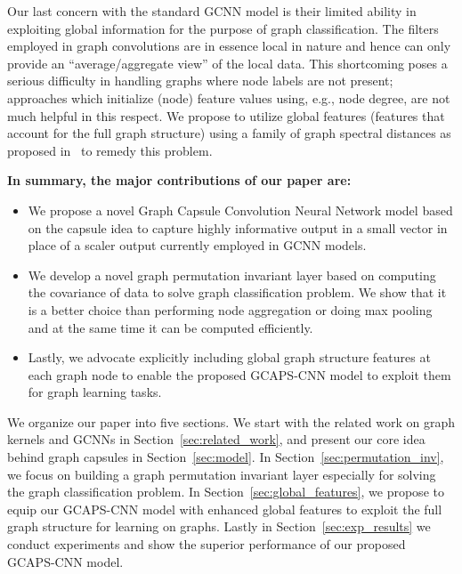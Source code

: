 \documentclass{article}
\begin{document}
Our last concern with the standard GCNN model  is their limited ability in exploiting global information for the purpose of  graph classification. The  filters employed in graph convolutions  are in essence  local in nature and hence can only provide an ``average/aggregate view'' of the local    data. This shortcoming poses a serious difficulty in handling graphs  where node labels are not present; approaches which initialize (node) feature values using, e.g.,  node degree, are not much helpful in this respect.   We propose to utilize global features (features that account for the full graph structure)  using a family of graph spectral distances as proposed in~\cite{verma2017hunt} to remedy this problem.


\textbf{In summary, the major contributions of our paper are: }
 
\begin{itemize}[leftmargin=*]
	\setlength\itemsep{-0.1em}
\item  We propose a novel Graph Capsule Convolution Neural  Network  model based on the capsule idea to capture highly informative output in a small vector  in place of a scaler output currently employed in  GCNN models. 
\item  We develop a novel graph permutation invariant layer based on computing the covariance of data to solve graph classification problem. We show that it is a better choice than performing node aggregation or doing max pooling and at the same time it can be computed efficiently.
\item  Lastly, we  advocate explicitly including global graph structure features  at each graph node to enable the proposed GCAPS-CNN model to exploit them for graph learning tasks. 
\end{itemize}

We organize our paper into five sections. We start with the related work on graph kernels and GCNNs in Section~\ref{sec:related_work}, and present our core idea behind graph capsules  in Section~\ref{sec:model}. In Section~\ref{sec:permutation_inv}, we focus on building a graph permutation invariant layer especially for solving the graph classification problem. In Section~\ref{sec:global_features}, we propose to equip our GCAPS-CNN model with enhanced global features to   exploit the full  graph   structure for learning on graphs. Lastly in Section~\ref{sec:exp_results} we conduct experiments and show the superior performance of our proposed GCAPS-CNN model.
\end{document}
